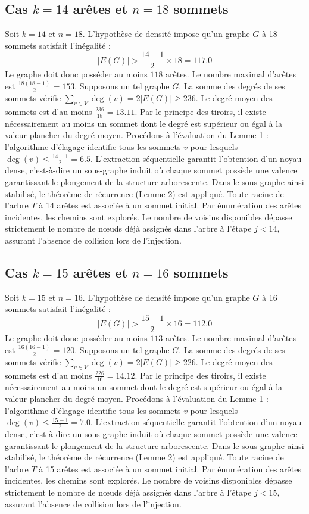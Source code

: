 \documentclass[12pt,a4paper]{article}
\begin{document}
\subsection{Cas $k = 14$ arêtes et $n = 18$ sommets}
Soit $k = 14$ et $n = 18$. L'hypothèse de densité impose qu'un graphe $G$ à 18 sommets satisfait l'inégalité :
$$ |E(G)| > \frac{14-1}{2} \times 18 = 117.0 $$
Le graphe doit donc posséder au moins $118$ arêtes. Le nombre maximal d'arêtes est $\frac{18(18-1)}{2} = 153$.
Supposons un tel graphe $G$. La somme des degrés de ses sommets vérifie $\sum_{v \in V} \deg(v) = 2|E(G)| \geq 236$.
Le degré moyen des sommets est d'au moins $\frac{236}{18} = 13.11$.
Par le principe des tiroirs, il existe nécessairement au moins un sommet dont le degré est supérieur ou égal à la valeur plancher du degré moyen.
Procédons à l'évaluation du Lemme 1 : l'algorithme d'élagage identifie tous les sommets $v$ pour lesquels $\deg(v) \leq \frac{14-1}{2} = 6.5$.
L'extraction séquentielle garantit l'obtention d'un noyau dense, c'est-à-dire un sous-graphe induit où chaque sommet possède une valence garantissant le plongement de la structure arborescente.
Dans le sous-graphe ainsi stabilisé, le théorème de récurrence (Lemme 2) est appliqué. Toute racine de l'arbre $T$ à 14 arêtes est associée à un sommet initial. Par énumération des arêtes incidentes, les chemins sont explorés. Le nombre de voisins disponibles dépasse strictement le nombre de nœuds déjà assignés dans l'arbre à l'étape $j < 14$, assurant l'absence de collision lors de l'injection.

\subsection{Cas $k = 15$ arêtes et $n = 16$ sommets}
Soit $k = 15$ et $n = 16$. L'hypothèse de densité impose qu'un graphe $G$ à 16 sommets satisfait l'inégalité :
$$ |E(G)| > \frac{15-1}{2} \times 16 = 112.0 $$
Le graphe doit donc posséder au moins $113$ arêtes. Le nombre maximal d'arêtes est $\frac{16(16-1)}{2} = 120$.
Supposons un tel graphe $G$. La somme des degrés de ses sommets vérifie $\sum_{v \in V} \deg(v) = 2|E(G)| \geq 226$.
Le degré moyen des sommets est d'au moins $\frac{226}{16} = 14.12$.
Par le principe des tiroirs, il existe nécessairement au moins un sommet dont le degré est supérieur ou égal à la valeur plancher du degré moyen.
Procédons à l'évaluation du Lemme 1 : l'algorithme d'élagage identifie tous les sommets $v$ pour lesquels $\deg(v) \leq \frac{15-1}{2} = 7.0$.
L'extraction séquentielle garantit l'obtention d'un noyau dense, c'est-à-dire un sous-graphe induit où chaque sommet possède une valence garantissant le plongement de la structure arborescente.
Dans le sous-graphe ainsi stabilisé, le théorème de récurrence (Lemme 2) est appliqué. Toute racine de l'arbre $T$ à 15 arêtes est associée à un sommet initial. Par énumération des arêtes incidentes, les chemins sont explorés. Le nombre de voisins disponibles dépasse strictement le nombre de nœuds déjà assignés dans l'arbre à l'étape $j < 15$, assurant l'absence de collision lors de l'injection.
\end{document}
